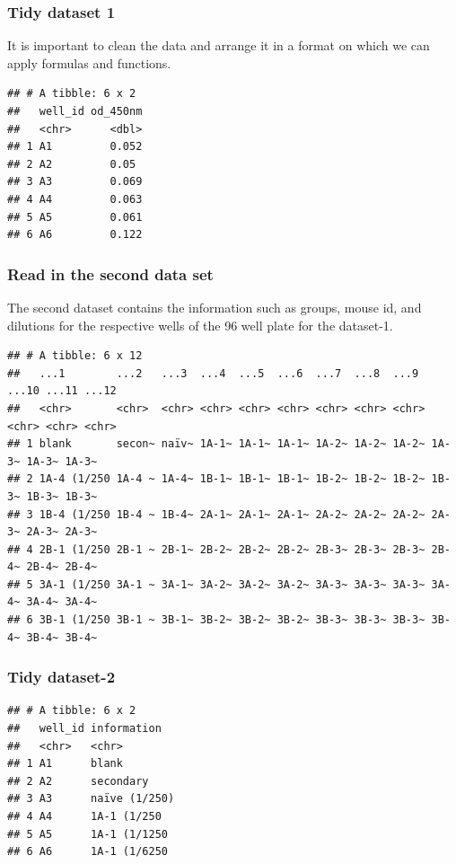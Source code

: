 \documentclass[
]{book}
\begin{document}
\hypertarget{tidy-dataset-1}{%
\subsubsection{Tidy dataset 1}\label{tidy-dataset-1}}

It is important to clean the data and arrange it in a format on which we can apply formulas and functions.

\begin{verbatim}
## # A tibble: 6 x 2
##   well_id od_450nm
##   <chr>      <dbl>
## 1 A1         0.052
## 2 A2         0.05 
## 3 A3         0.069
## 4 A4         0.063
## 5 A5         0.061
## 6 A6         0.122
\end{verbatim}

\hypertarget{read-in-the-second-data-set}{%
\subsubsection{Read in the second data set}\label{read-in-the-second-data-set}}

The second dataset contains the information such as groups, mouse id, and dilutions for the respective wells of the 96 well plate for the dataset-1.

\begin{verbatim}
## # A tibble: 6 x 12
##   ...1        ...2   ...3  ...4  ...5  ...6  ...7  ...8  ...9  ...10 ...11 ...12
##   <chr>       <chr>  <chr> <chr> <chr> <chr> <chr> <chr> <chr> <chr> <chr> <chr>
## 1 blank       secon~ naïv~ 1A-1~ 1A-1~ 1A-1~ 1A-2~ 1A-2~ 1A-2~ 1A-3~ 1A-3~ 1A-3~
## 2 1A-4 (1/250 1A-4 ~ 1A-4~ 1B-1~ 1B-1~ 1B-1~ 1B-2~ 1B-2~ 1B-2~ 1B-3~ 1B-3~ 1B-3~
## 3 1B-4 (1/250 1B-4 ~ 1B-4~ 2A-1~ 2A-1~ 2A-1~ 2A-2~ 2A-2~ 2A-2~ 2A-3~ 2A-3~ 2A-3~
## 4 2B-1 (1/250 2B-1 ~ 2B-1~ 2B-2~ 2B-2~ 2B-2~ 2B-3~ 2B-3~ 2B-3~ 2B-4~ 2B-4~ 2B-4~
## 5 3A-1 (1/250 3A-1 ~ 3A-1~ 3A-2~ 3A-2~ 3A-2~ 3A-3~ 3A-3~ 3A-3~ 3A-4~ 3A-4~ 3A-4~
## 6 3B-1 (1/250 3B-1 ~ 3B-1~ 3B-2~ 3B-2~ 3B-2~ 3B-3~ 3B-3~ 3B-3~ 3B-4~ 3B-4~ 3B-4~
\end{verbatim}

\hypertarget{tidy-dataset-2}{%
\subsubsection{Tidy dataset-2}\label{tidy-dataset-2}}

\begin{verbatim}
## # A tibble: 6 x 2
##   well_id information  
##   <chr>   <chr>        
## 1 A1      blank        
## 2 A2      secondary    
## 3 A3      naïve (1/250)
## 4 A4      1A-1 (1/250  
## 5 A5      1A-1 (1/1250 
## 6 A6      1A-1 (1/6250
\end{verbatim}
\end{document}
